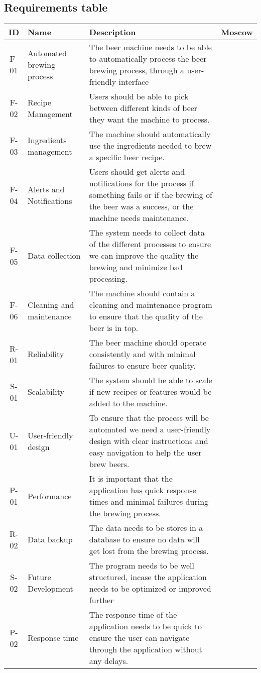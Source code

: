 \subsection{Requirements table}
\begin{center}
    \sloppy
    \begin{longtable}{|c|p{3.5cm}|p{7cm}|c|}
        \hline
        ID & Name & Description & Moscow \\ \hline
        F-01   & Automated brewing process & The beer machine needs to be able to automatically process the beer brewing process, through a user-friendly interface &  \\ \hline
        F-02   & Recipe Management & Users should be able to pick between different kinds of beer they want the machine to process. &  \\ \hline
        F-03   & Ingredients management & The machine should automatically use the ingredients needed to brew a specific beer recipe. &  \\ \hline
        F-04   & Alerts and Notifications & Users should get alerts and notifications for the process if something fails or if the brewing of the beer was a success, or the machine needs maintenance. &  \\ \hline
        F-05  & Data collection & The system needs to collect data of the different processes to ensure we can improve the quality the brewing and minimize bad processing. &  \\ \hline
        F-06   & Cleaning and maintenance & The machine should contain a cleaning and maintenance program to ensure that the quality of the beer is in top.&  \\ \hline
        R-01   & Reliability & The beer machine should operate consistently and with minimal failures to ensure beer quality. &  \\ \hline
        S-01   & Scalability & The system should be able to scale if new recipes or features would be added to the machine. &  \\ \hline
        U-01  & User-friendly design & To ensure that the process will be automated we need a user-friendly design with clear instructions and easy navigation to help the user brew beers. &  \\ \hline
        P-01   & Performance & It is important that the application has quick response times and minimal failures during the brewing process. &  \\ \hline
        R-02  & Data backup & The data needs to be stores in a database to ensure no data will get lost from the brewing process. &  \\ \hline
        S-02   & Future Development & The program needs to be well structured, incase the application needs to be optimized or improved further &  \\ \hline
        P-02   & Response time & The response time of the application needs to be quick to ensure the user can navigate through the application without any delays. &  \\ \hline


\end{longtable}
\end{center}
